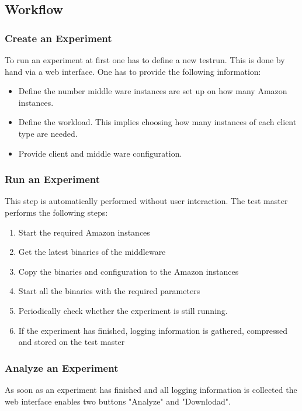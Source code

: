 \documentclass[a4paper]{article}
\begin{document}
\subsection{Workflow}

\subsubsection{Create an Experiment}
To run an experiment at first one has to define a new testrun. This is done by hand via a web interface. One has to provide the following information:

\begin{itemize}
\item Define the number middle ware instances are set up on how many Amazon instances.
\item Define the workload. This implies choosing how many instances of each client type are needed.
\item Provide client and middle ware configuration.
\end{itemize}

\subsubsection{Run an Experiment}
This step is automatically performed without user interaction. The test master performs the following steps:

\begin{enumerate}
\item Start the required Amazon instances
\item Get the latest binaries of the middleware
\item Copy the binaries and configuration to the Amazon instances
\item Start all the binaries with the required parameters
\item Periodically check whether the experiment is still running.
\item If the experiment has finished, logging information is gathered, compressed and stored on the test master
\end{enumerate}

\subsubsection{Analyze an Experiment}
As soon as an experiment has finished and all logging information is collected the web interface enables two buttons "Analyze" and "Downlodad". 
\end{document}
